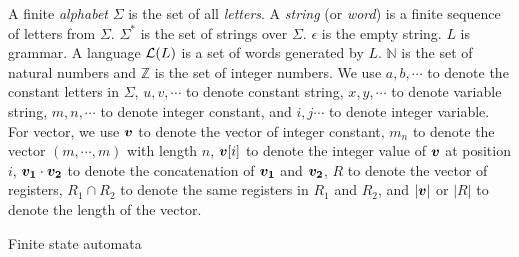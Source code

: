 %


A finite \emph{alphabet} $\Sigma$ is the set of all \emph{letters}. A
\emph{string} (or \emph{word}) is a finite sequence of letters from $\Sigma$. $\Sigma^*$ is the set of strings over $\Sigma$. $\epsilon$ is the empty string. $L$ is grammar. A language $\mathcal{L}(L)$ is a set of words generated by $L$. $\mathbb{N}$ is the set of natural numbers and $\mathbb{Z}$ is the set of integer numbers. We use $a,
  b,\cdots$ to denote the constant letters in $\Sigma$, $u, v,\cdots$ to denote constant
string, $x, y,\cdots$ to denote variable string, $m,n,\cdots$ to
denote integer constant, and $i,j\cdots$ to denote integer variable. For vector, we use $\myvec{v}$ to denote the vector of integer constant, $m_n$ to denote the vector $(m,\cdots, m)$ with length $n$, $\myvec{v}[i]$ to denote the integer value of $\myvec{v}$ at position $i$, $\myvec{v_1}\cdot\myvec{v_2}$ to denote the concatenation of $\myvec{v_1}$ and $\myvec{v_2}$, $R$ to denote the vector of registers, $R_1 \cap R_2$ to denote the same registers in $R_1$ and $R_2$, and $|\myvec{v}|$ or $|R|$ to denote the length of the vector.

Finite state automata
